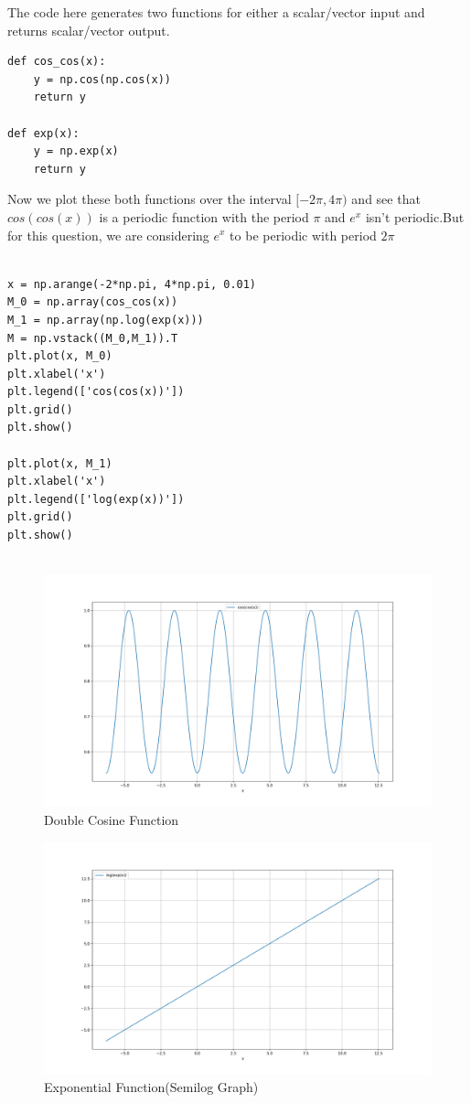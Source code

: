 \documentclass[12pt, a4paper]{report}
\begin{document}
The code here generates two functions for either a scalar/vector input and returns scalar/vector output.   

\begin{Verbatim}
def cos_cos(x):
    y = np.cos(np.cos(x))
    return y

def exp(x):
    y = np.exp(x)
    return y
\end{Verbatim}

Now we plot these both functions over the interval $ [-2\pi, 4\pi)$ and see that $cos(cos(x))$ is a periodic function with the period $\pi$ and $e^x$ isn't periodic.But for this question, we are considering $e^x$ to be periodic with period $2\pi$

\begin{Verbatim}

x = np.arange(-2*np.pi, 4*np.pi, 0.01)
M_0 = np.array(cos_cos(x))
M_1 = np.array(np.log(exp(x)))
M = np.vstack((M_0,M_1)).T
plt.plot(x, M_0)
plt.xlabel('x')
plt.legend(['cos(cos(x))'])
plt.grid()
plt.show()

plt.plot(x, M_1)
plt.xlabel('x')
plt.legend(['log(exp(x))'])
plt.grid()
plt.show()


\end{Verbatim}


\begin{figure}[!tbh]
   	\centering
   	\includegraphics[scale=0.25]{Q1.png}
   	\caption{Double Cosine Function}
   	\label{fig:allgraphs}
   \end{figure} 


 \begin{figure}[!tbh]
   	\centering
   	\includegraphics[scale=0.25]{Q1b.png}
	\caption{Exponential Function(Semilog Graph)}
   	\label{fig:trueNoMatrix}
 \end{figure}
\end{document}
